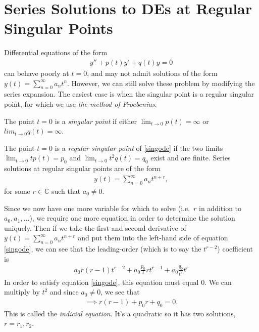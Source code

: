 \documentclass{book}
\begin{document}
\chapter{Series Solutions to DEs at Regular Singular Points}
Differential equations of the form
\begin{align}
\label{singode}
y'' + p(t)y' + q(t)y=0
\end{align}
can behave poorly at $t=0$, and may not admit solutions of the form
$y(t) =\sum_{n=0}^\infty a_n t^n$. However, we can still solve these problem
by modifying the series expansion. The easiest case is when the singular
point is a regular singular point, for which we use \emph{the method of
Froebenius}.

The point $t=0$ is a \emph{singular point} if either
$\lim_{t \rightarrow 0}p(t)=\infty$ or  $lim_{t \rightarrow 0}q(t)=\infty$.

The point $t=0$ is a \emph{regular singular point} of \eqref{singode} if
the two limits $\lim_{t\rightarrow 0} t p(t) =p_0$
and $\lim_{t\rightarrow 0} t^2 q(t) =q_0$
exist and are finite. Series solutions at regular singular points are of the
form
\begin{align}
\boxed{y(t) = \sum_{n=0}^\infty a_n t^{n+r}},
\end{align}
for some $r\in\mathbb{C}$ such that $a_0 \neq 0$.

Since we now have one more variable for which to solve (i.e.\ $r$ in addition
to $a_0, a_1,\dots$), we require one more equation in order to determine the
solution uniquely. Then if we take the first and second derivative of
$y(t) = \sum_{n=0}^\infty a_n t^{n+r}$ and put them into the left-hand side of
equation \eqref{singode}, we can see that the
leading-order (which is to say the $t^{r-2}$) coefficient is
\begin{align*}
a_0 r(r-1)t^{r-2} + a_0 \frac{p_0}{t} r t^{r-1} + a_0 \frac{q_0}{t^2} t^r
\end{align*}
In order to satisfy equation \eqref{singode}, this equation must equal $0$.
We can multiply by $t^2$ and since $a_0 \neq 0$, we see that
\begin{align}
\boxed{\implies r(r-1) + p_0 r  + q_0=0}.
\end{align}
This is called the \emph{indicial equation}. It's a quadratic so it has two
solutions, $r=r_1,r_2$.
\end{document}
